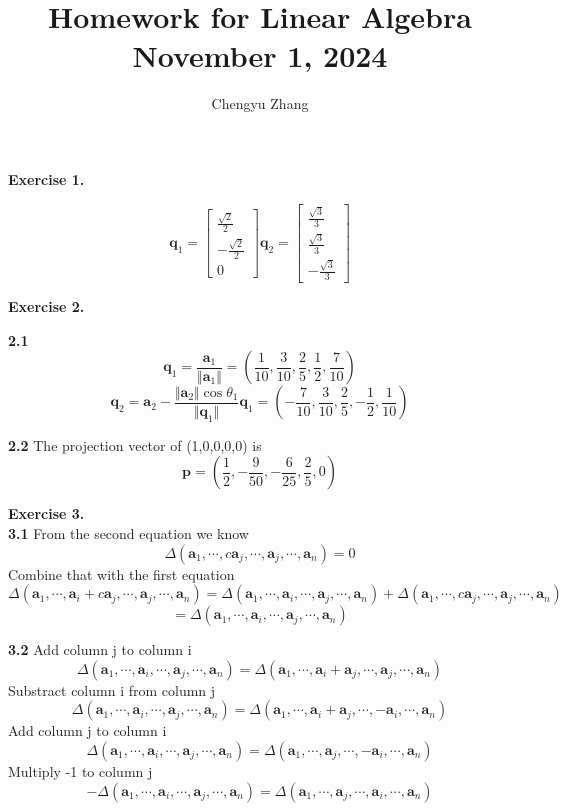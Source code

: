 \documentclass{article}
\title{\vspace*{-3.5cm}Homework for Linear Algebra \\November 1, 2024}
\author{Chengyu Zhang}
\date{}
\begin{document}
\maketitle

\textbf{Exercise 1.}

\[
\mathbf{q}_1 = \begin{bmatrix}
    \frac{\sqrt{2}}{2} \\ -\frac{\sqrt{2}}{2} \\ 0
\end{bmatrix}
\mathbf{q}_2 = \begin{bmatrix}
    \frac{\sqrt{3}}{3} \\ \frac{\sqrt{3}}{3} \\ -\frac{\sqrt{3}}{3}
\end{bmatrix}
\]

\textbf{Exercise 2.}

\textbf{2.1}
\[
\mathbf{q}_1=\frac{\mathbf{a}_1}{\Vert \mathbf{a}_1 \Vert} = (\dfrac{1}{10},\dfrac{3}{10},\dfrac{2}{5},\dfrac{1}{2},\dfrac{7}{10})
\]
\[
\mathbf{q}_2=\mathbf{a}_2-\dfrac{\Vert \mathbf{a}_2 \Vert \cos \theta_1}{\Vert \mathbf{q}_1 \Vert}\mathbf{q}_1=(-\dfrac{7}{10},\dfrac{3}{10},\dfrac{2}{5},-\dfrac{1}{2},\dfrac{1}{10})
\]

\textbf{2.2} The projection vector of (1,0,0,0,0) is
\[
\mathbf{p}=(\dfrac{1}{2},-\dfrac{9}{50},-\dfrac{6}{25},\dfrac{2}{5},0)
\]

\textbf{Exercise 3.}\\

\textbf{3.1}
From the second equation we know\[
\Delta (\mathbf{a}_1,\cdots,c\mathbf{a}_j,\cdots,\mathbf{a}_j,\cdots,\mathbf{a}_n) = 0
\]
Combine that with the first equation\[
\Delta (\mathbf{a}_1,\cdots,\mathbf{a}_i+c\mathbf{a}_j,\cdots,\mathbf{a}_j,\cdots,\mathbf{a}_n) =
\Delta (\mathbf{a}_1,\cdots,\mathbf{a}_i,\cdots,\mathbf{a}_j,\cdots,\mathbf{a}_n) + \Delta (\mathbf{a}_1,\cdots,c\mathbf{a}_j,\cdots,\mathbf{a}_j,\cdots,\mathbf{a}_n)
\]
\[
=\Delta (\mathbf{a}_1,\cdots,\mathbf{a}_i,\cdots,\mathbf{a}_j,\cdots,\mathbf{a}_n)
\]

\textbf{3.2}
Add column j to column i
\[
\Delta (\mathbf{a}_1,\cdots,\mathbf{a}_i,\cdots,\mathbf{a}_j,\cdots,\mathbf{a}_n)
=
\Delta (\mathbf{a}_1,\cdots,\mathbf{a}_i+\mathbf{a}_j,\cdots,\mathbf{a}_j,\cdots,\mathbf{a}_n)
\]
Substract column i from column j
\[
\Delta (\mathbf{a}_1,\cdots,\mathbf{a}_i,\cdots,\mathbf{a}_j,\cdots,\mathbf{a}_n)
=
\Delta (\mathbf{a}_1,\cdots,\mathbf{a}_i+\mathbf{a}_j,\cdots,-\mathbf{a}_i,\cdots,\mathbf{a}_n)
\]
Add column j to column i
\[
\Delta (\mathbf{a}_1,\cdots,\mathbf{a}_i,\cdots,\mathbf{a}_j,\cdots,\mathbf{a}_n)
=
\Delta (\mathbf{a}_1,\cdots,\mathbf{a}_j,\cdots,-\mathbf{a}_i,\cdots,\mathbf{a}_n)
\]
Multiply -1 to column j
\[
-\Delta (\mathbf{a}_1,\cdots,\mathbf{a}_i,\cdots,\mathbf{a}_j,\cdots,\mathbf{a}_n)
=
\Delta (\mathbf{a}_1,\cdots,\mathbf{a}_j,\cdots,\mathbf{a}_i,\cdots,\mathbf{a}_n)
\]
\end{document}
